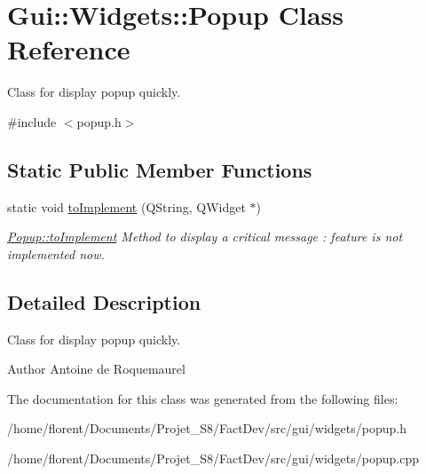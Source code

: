 \hypertarget{classGui_1_1Widgets_1_1Popup}{\section{Gui\-:\-:Widgets\-:\-:Popup Class Reference}
\label{classGui_1_1Widgets_1_1Popup}
}


Class for display popup quickly.  




{\ttfamily \#include $<$popup.\-h$>$}

\subsection*{Static Public Member Functions}
\begin{DoxyCompactItemize}
\item 
\hypertarget{classGui_1_1Widgets_1_1Popup_ac4a9958b16b454eab84eeb95a1f01fa7}{static void \hyperlink{classGui_1_1Widgets_1_1Popup_ac4a9958b16b454eab84eeb95a1f01fa7}{to\-Implement} (Q\-String, Q\-Widget $\ast$)}\label{classGui_1_1Widgets_1_1Popup_ac4a9958b16b454eab84eeb95a1f01fa7}

\begin{DoxyCompactList}\small\item\em \hyperlink{classGui_1_1Widgets_1_1Popup_ac4a9958b16b454eab84eeb95a1f01fa7}{Popup\-::to\-Implement} Method to display a critical message \-: feature is not implemented now. \end{DoxyCompactList}\end{DoxyCompactItemize}


\subsection{Detailed Description}
Class for display popup quickly. 

\begin{DoxyAuthor}{Author}
Antoine de Roquemaurel 
\end{DoxyAuthor}


The documentation for this class was generated from the following files\-:\begin{DoxyCompactItemize}
\item 
/home/florent/\-Documents/\-Projet\-\_\-\-S8/\-Fact\-Dev/src/gui/widgets/popup.\-h\item 
/home/florent/\-Documents/\-Projet\-\_\-\-S8/\-Fact\-Dev/src/gui/widgets/popup.\-cpp\end{DoxyCompactItemize}

